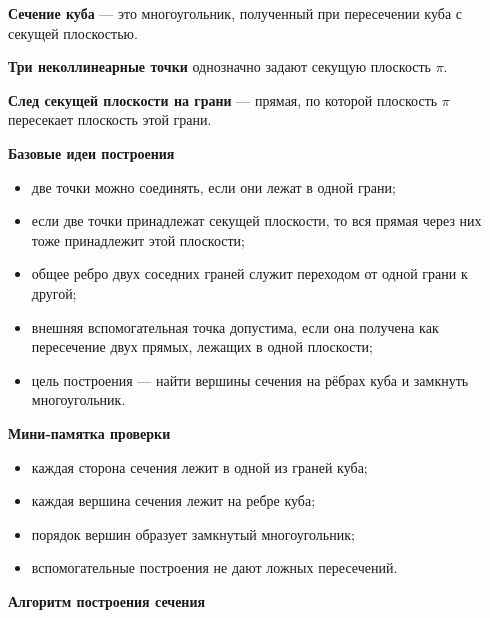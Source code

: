 \documentclass[a4paper,12pt]{article}
\newcommand{\term}[1]{\textbf{\color{darkaccent}#1}}
\newcommand{\Plane}{\ensuremath{\pi}}
\begin{document}
\term{Сечение куба} --- это многоугольник, полученный при пересечении куба
с секущей плоскостью.

\term{Три неколлинеарные точки} однозначно задают секущую плоскость \Plane.

\term{След секущей плоскости на грани} --- прямая, по которой плоскость \Plane
пересекает плоскость этой грани.

\term{Базовые идеи построения}

\begin{itemize}
\item две точки можно соединять, если они лежат в одной грани;
\item если две точки принадлежат секущей плоскости, то вся прямая через них
тоже принадлежит этой плоскости;
\item общее ребро двух соседних граней служит переходом от одной грани к другой;
\item внешняя вспомогательная точка допустима, если она получена как пересечение
двух прямых, лежащих в одной плоскости;
\item цель построения --- найти вершины сечения на рёбрах куба и замкнуть
многоугольник.
\end{itemize}

\term{Мини-памятка проверки}

\begin{itemize}
\item каждая сторона сечения лежит в одной из граней куба;
\item каждая вершина сечения лежит на ребре куба;
\item порядок вершин образует замкнутый многоугольник;
\item вспомогательные построения не дают ложных пересечений.
\end{itemize}


\clearpage
\thispagestyle{plain}

\begin{center}
{\Large\color{darkaccent}\textbf{Алгоритм построения сечения}}
\end{center}

\vspace{4mm}
\end{document}
